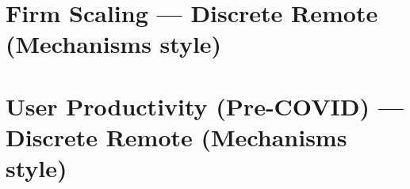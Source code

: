 \documentclass{article}
\newcommand{\cleanedresultsdir}{../../results/cleaned}
\begin{document}
\section*{Firm Scaling — Discrete Remote (Mechanisms style)}


\section*{User Productivity (Pre-COVID) — Discrete Remote (Mechanisms style)}

\end{document}
